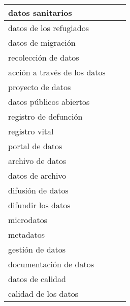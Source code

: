 \documentclass[
]{article}
\begin{document}
\begin{table}[H]
\begin{tabular}{l|l|l}
\hline
datos sanitarios &  & \\
\hline
datos de los refugiados &  & \\
\hline
datos de migración &  & \\
\hline
recolección de datos &  & \\
\hline
acción a través de los datos &  & \\
\hline
proyecto de datos &  & \\
\hline
datos públicos abiertos &  & \\
\hline
registro de defunción &  & \\
\hline
registro vital &  & \\
\hline
portal de datos &  & \\
\hline
archivo de datos &  & \\
\hline
datos de archivo &  & \\
\hline
difusión de datos &  & \\
\hline
difundir los datos &  & \\
\hline
microdatos &  & \\
\hline
metadatos &  & \\
\hline
gestión de datos &  & \\
\hline
documentación de datos &  & \\
\hline
datos de calidad &  & \\
\hline
calidad de los datos &  & \\
\hline
\end{tabular}
\endgroup{}
\end{table}
\end{document}
